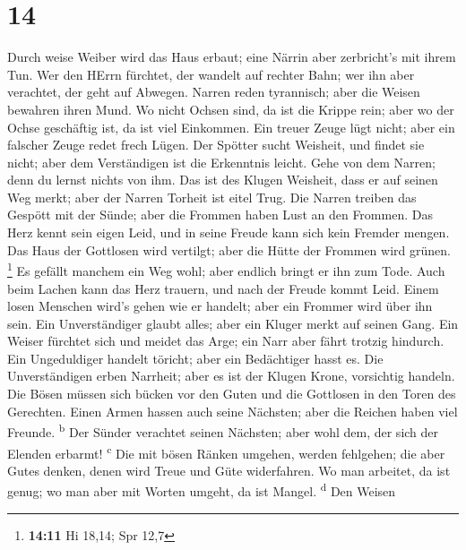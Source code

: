 \hypertarget{section-13}{%
\section{14}\label{section-13}}

 Durch weise Weiber wird das Haus erbaut; eine Närrin aber
zerbricht's mit ihrem Tun.  Wer den HErrn fürchtet, der
wandelt auf rechter Bahn; wer ihn aber verachtet, der geht auf Abwegen.
 Narren reden tyrannisch; aber die Weisen bewahren ihren
Mund.  Wo nicht Ochsen sind, da ist die Krippe rein; aber
wo der Ochse geschäftig ist, da ist viel Einkommen.  Ein
treuer Zeuge lügt nicht; aber ein falscher Zeuge redet frech Lügen.
 Der Spötter sucht Weisheit, und findet sie nicht; aber
dem Verständigen ist die Erkenntnis leicht.  Gehe von dem
Narren; denn du lernst nichts von ihm.  Das ist des Klugen
Weisheit, dass er auf seinen Weg merkt; aber der Narren Torheit ist
eitel Trug.  Die Narren treiben das Gespött mit der Sünde;
aber die Frommen haben Lust an den Frommen.  Das Herz
kennt sein eigen Leid, und in seine Freude kann sich kein Fremder
mengen.  Das Haus der Gottlosen wird vertilgt; aber die
Hütte der Frommen wird grünen. \footnote{\textbf{14:11} Hi 18,14; Spr
  12,7}  Es gefällt manchem ein Weg wohl; aber endlich
bringt er ihn zum Tode.  Auch beim Lachen kann das Herz
trauern, und nach der Freude kommt Leid.  Einem losen
Menschen wird's gehen wie er handelt; aber ein Frommer wird über ihn
sein.  Ein Unverständiger glaubt alles; aber ein Kluger
merkt auf seinen Gang.  Ein Weiser fürchtet sich und
meidet das Arge; ein Narr aber fährt trotzig hindurch. 
Ein Ungeduldiger handelt töricht; aber ein Bedächtiger hasst es.
 Die Unverständigen erben Narrheit; aber es ist der
Klugen Krone, vorsichtig handeln.  Die Bösen müssen sich
bücken vor den Guten und die Gottlosen in den Toren des Gerechten.
 Einen Armen hassen auch seine Nächsten; aber die Reichen
haben viel Freunde. \textsuperscript{b}  Der Sünder
verachtet seinen Nächsten; aber wohl dem, der sich der Elenden erbarmt!
\textsuperscript{c}  Die mit bösen Ränken umgehen, werden
fehlgehen; die aber Gutes denken, denen wird Treue und Güte widerfahren.
 Wo man arbeitet, da ist genug; wo man aber mit Worten
umgeht, da ist Mangel. \textsuperscript{d}  Den Weisen
